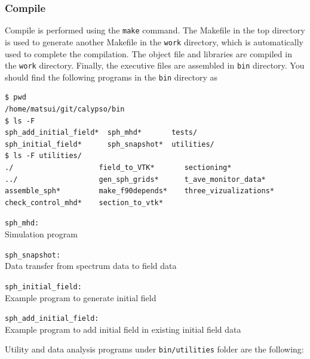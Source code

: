 \subsubsection{Compile}
Compile is performed using the {\tt make} command. The Makefile in the top directory is used to generate another Makefile in the {\tt work} directory, which is automatically used to complete the compilation. The object file and libraries are compiled in the {\tt work} directory. Finally, the executive files are assembled in {\tt bin} directory. You should find the following programs in the {\tt bin} directory as
%
\begin{verbatim}
$ pwd
/home/matsui/git/calypso/bin
$ ls -F
sph_add_initial_field*  sph_mhd*       tests/
sph_initial_field*      sph_snapshot*  utilities/
$ ls -F utilities/
./                    field_to_VTK*       sectioning*
../                   gen_sph_grids*      t_ave_monitor_data*
assemble_sph*         make_f90depends*    three_vizualizations*
check_control_mhd*    section_to_vtk*
\end{verbatim}
%
%
\begin{description}
\item{\tt sph\_mhd:          }\\
 Simulation program
\item{\tt sph\_snapshot:     }\\
 Data transfer from spectrum data to field data
\item{\tt sph\_initial\_field: }\\
 Example program to generate initial field
\item{\tt sph\_add\_initial\_field: }\\
 Example program to add initial field in existing initial field data
\end{description}
%
 Utility and data analysis programs under {\tt bin/utilities} folder are the following:
%
